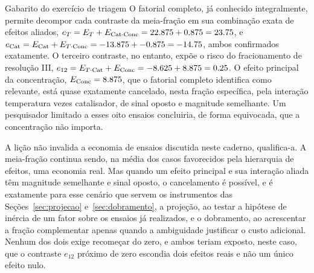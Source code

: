 \documentclass{doeapostila}
\begin{document}
\begin{aplicacao}{Gabarito do exercício de triagem}
  O fatorial completo, já conhecido integralmente, permite decompor cada
  contraste da meia-fração em sua combinação exata de efeitos aliados,
  $e_{T} = E_{T} + E_{\mathrm{Cat}\cdot\mathrm{Conc}} =
  \num{22.875} + \num{0.875} = \num{23.75}$, e
  $e_{\mathrm{Cat}} = E_{\mathrm{Cat}} + E_{T\cdot\mathrm{Conc}} =
  \num{-13.875} + \num{-0.875} = \num{-14.75}$, ambos confirmados
  exatamente. O terceiro contraste, no entanto, expõe o risco do
  fracionamento de resolução III, $e_{12} = E_{T\cdot\mathrm{Cat}} +
  E_{\mathrm{Conc}} = \num{-8.625} + \num{8.875} = \num{0.25}$. O efeito
  principal da concentração, $E_{\mathrm{Conc}} = \num{8.875}$, que o
  fatorial completo identifica como relevante, está quase exatamente
  cancelado, nesta fração específica, pela interação
  temperatura vezes catalisador, de sinal oposto e magnitude semelhante. Um
  pesquisador limitado a esses oito ensaios concluiria, de forma equivocada,
  que a concentração não importa.

  A lição não invalida a economia de ensaios discutida neste caderno,
  qualifica-a. A meia-fração continua sendo, na média dos casos favorecidos
  pela hierarquia de efeitos, uma economia real. Mas quando um efeito
  principal e sua interação aliada têm magnitude semelhante e sinal oposto,
  o cancelamento é possível, e é exatamente para esse cenário que servem os
  instrumentos das Seções~\ref{sec:projecao} e~\ref{sec:dobramento}, a
  projeção, ao testar a hipótese de inércia de um fator sobre os ensaios já
  realizados, e o dobramento, ao acrescentar a fração complementar apenas
  quando a ambiguidade justificar o custo adicional. Nenhum dos dois exige
  recomeçar do zero, e ambos teriam exposto, neste caso, que o contraste
  $e_{12}$ próximo de zero escondia dois efeitos reais e não um único efeito
  nulo.
\end{aplicacao}

\paginadireitos
\end{document}
